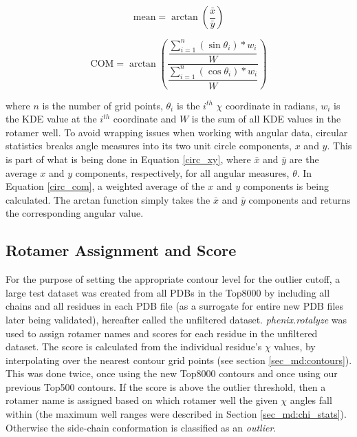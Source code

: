 \begin{equation}
\textrm{mean} = \arctan\left (
\frac{\bar{x}}{\bar{y}}
\right )
\label{circ_m}
\end{equation}

\begin{equation}
\textrm{COM} = \arctan\left (
  \dfrac{
    \dfrac{\sum_{i=1}^{n}\left ( \sin \theta_{i} \right )\ast w_{i}}{W}
  }{
    \dfrac{\sum_{i=1}^{n} \left ( \cos \theta_{i} \right )\ast w_{i}}{W}
  }
\right )
\label{circ_com}
\end{equation}

\noindent where $n$ is the number of grid points, $\theta_{i}$ is the $i^{th}$ $\chi$ coordinate in radians, $w_{i}$ is the KDE value at the $i^{th}$ coordinate and $W$ is the sum of all KDE values in the rotamer well. To avoid wrapping issues when working with angular data, circular statistics breaks angle measures into its two unit circle components, $x$ and $y$. This is part of what is being done in Equation \ref{circ_xy}, where $\bar{x}$ and $\bar{y}$ are the average $x$ and $y$ components, respectively, for all angular measures, $\theta$. In Equation \ref{circ_com}, a weighted average of the $x$ and $y$ components is being calculated. The arctan function simply takes the $\bar{x}$ and $\bar{y}$ components and returns the corresponding angular value.

\subsection{Rotamer Assignment and Score}
\label{sec_md:rotaassign}
For the purpose of setting the appropriate contour level for the outlier cutoff, a large test dataset was created from all PDBs in the Top8000 by including all chains and all residues in each PDB file (as a surrogate for entire new PDB files later being validated), hereafter called the unfiltered dataset. \textit{phenix.rotalyze} was used to assign rotamer names and scores for each residue in the unfiltered dataset. The score is calculated from the individual residue's $\chi$ values, by interpolating over the nearest contour grid points (see section \ref{sec_md:contours}). This was done twice, once using the new Top8000 contours and once using our previous Top500 contours. If the score is above the outlier threshold, then a rotamer name is assigned based on which rotamer well the given $\chi$ angles fall within (the maximum well ranges were described in Section \ref{sec_md:chi_stats}). Otherwise the side-chain conformation is classified as an \textit{outlier}.
